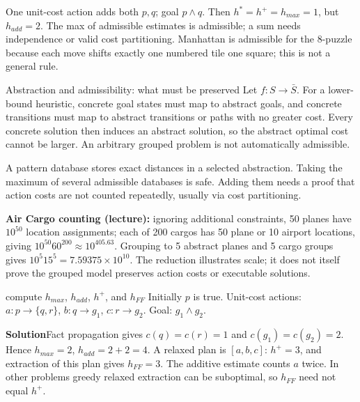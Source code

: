 \documentclass[10pt,a4paper]{article}
\newcommand{\ans}{\par\smallskip\textbf{\color{good}Solution\quad}}
\begin{document}
\begin{note}
One unit-cost action adds both $p,q$; goal $p\land q$. Then $h^*=h^+=h_{max}=1$, but $h_{add}=2$. The max of admissible estimates is admissible; a sum needs independence or valid cost partitioning. Manhattan is admissible for the 8-puzzle because each move shifts exactly one numbered tile one square; this is not a general rule.
\end{note}

\begin{card}{Abstraction and admissibility: what must be preserved}
Let $f:S\to\bar S$. For a lower-bound heuristic, concrete goal states must map to abstract goals, and concrete transitions must map to abstract transitions or paths with no greater cost. Every concrete solution then induces an abstract solution, so the abstract optimal cost cannot be larger. An arbitrary grouped problem is not automatically admissible.

A pattern database stores exact distances in a selected abstraction. Taking the maximum of several admissible databases is safe. Adding them needs a proof that action costs are not counted repeatedly, usually via cost partitioning.

\textbf{Air Cargo counting (lecture):} ignoring additional constraints, 50 planes have $10^{50}$ location assignments; each of 200 cargos has 50 plane or 10 airport locations, giving $10^{50}60^{200}\approx10^{405.63}$. Grouping to 5 abstract planes and 5 cargo groups gives $10^5 15^5=7.59375\times10^{10}$. The reduction illustrates scale; it does not itself prove the grouped model preserves action costs or executable solutions.
\end{card}

\begin{question}{compute $h_{max}$, $h_{add}$, $h^+$, and $h_{FF}$}
Initially $p$ is true. Unit-cost actions: $a:p\to\{q,r\}$, $b:q\to g_1$, $c:r\to g_2$. Goal: $g_1\land g_2$.
\ans Fact propagation gives $c(q)=c(r)=1$ and $c(g_1)=c(g_2)=2$. Hence $h_{max}=2$, $h_{add}=2+2=4$. A relaxed plan is $[a,b,c]$: $h^+=3$, and extraction of this plan gives $h_{FF}=3$. The additive estimate counts $a$ twice. In other problems greedy relaxed extraction can be suboptimal, so $h_{FF}$ need not equal $h^+$.
\end{question}
\end{document}
